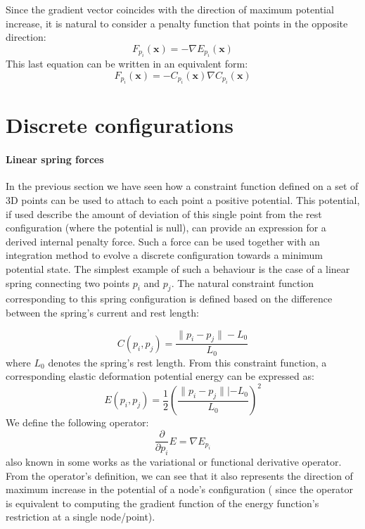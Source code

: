 \documentclass[12pt]{article}
\begin{document}
Since the gradient vector coincides with the direction of maximum potential increase, it is natural to consider a penalty function that points in the opposite direction:
\begin{equation}
\label{penalty_function}
F_{p_i}(\mathbf{x}) = - \nabla E_{p_i}(\mathbf{x})
\end{equation}
This last equation can be written in an equivalent form:
\begin{equation}
F_{p_i}(\mathbf{x}) = -C_{p_i}(\mathbf{x}) \nabla{C_{p_i}(\mathbf{x})}
\end{equation}
\section{Discrete configurations}

\paragraph{Linear spring forces}

In the previous section we have seen how a constraint function defined on a set of 3D points can be used to attach to each point a positive potential. This potential, if used
describe the amount of deviation of this single point from the rest configuration (where the potential is null), can provide an expression for a derived internal penalty force.
Such a force can be used together with an integration method to evolve a discrete configuration towards a minimum potential state. The simplest example of such a behaviour is the case of a linear spring connecting two points $p_i$ and $p_j$. The natural constraint function corresponding to this spring configuration is defined based on the difference between the spring's current and rest length:

\begin{equation}
C(p_i,p_j) = \frac{\|p_i - p_j \| - L_0}{L_0}
\end{equation}
where $L_0$ denotes the spring's rest length. From this constraint function, a corresponding elastic deformation potential energy can be expressed as:
\begin{equation}
\label{elastic_energy}
E(p_i,p_j) = \frac{1}{2} \left( \frac{\|p_i - p_j\|| - L_0}{L_0} \right)^ 2
\end{equation}
We define the following operator:
\begin{equation}
\frac{\partial}{\partial p_i} E = \nabla E_{p_i}
\end{equation}
also known in some works as the variational or functional derivative operator. From the operator's definition, we can see that it also represents the direction of maximum increase in the potential of a node's configuration ( since the operator is equivalent to computing the gradient function of the energy function's restriction at a single node/point).
\end{document}
